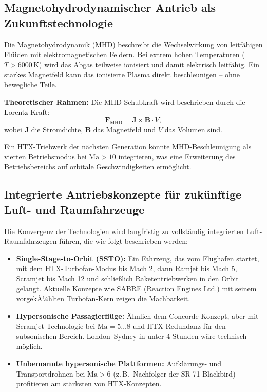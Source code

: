 ﻿\documentclass[12pt,a4paper]{article}
\theoremstyle{remark}
\newcommand{\Ma}{\mathrm{Ma}}
\begin{document}
\subsection{Magnetohydrodynamischer Antrieb als Zukunftstechnologie}

Die Magnetohydrodynamik (MHD) beschreibt die Wechselwirkung von
leitf\"ahigen Fl\"uiden mit elektromagnetischen Feldern.
Bei extrem hohen Temperaturen ($T > 6000\,\mathrm{K}$) wird
das Abgas teilweise ionisiert und damit elektrisch leitf\"ahig.
Ein starkes Magnetfeld kann das ionisierte Plasma direkt beschleunigen
-- ohne bewegliche Teile.

\textbf{Theoretischer Rahmen:}
Die MHD-Schubkraft wird beschrieben durch die Lorentz-Kraft:
\begin{equation}
  \mathbf{F}_{\mathrm{MHD}} = \mathbf{J} \times \mathbf{B} \cdot V,
  \label{eq:mhd}
\end{equation}
wobei $\mathbf{J}$ die Stromdichte, $\mathbf{B}$ das Magnetfeld und $V$ das Volumen sind.

Ein HTX-Triebwerk der n\"achsten Generation k\"onnte MHD-Beschleunigung
als vierten Betriebsmodus bei $\Ma > 10$ integrieren,
was eine Erweiterung des Betriebsbereichs auf orbitale Geschwindigkeiten erm\"oglicht.

\subsection{Integrierte Antriebskonzepte f\"ur zuk\"unftige Luft- und Raumfahrzeuge}

Die Konvergenz der Technologien wird langfristig zu vollst\"andig
integrierten Luft-Raumfahrzeugen f\"uhren, die wie folgt beschrieben werden:

\begin{itemize}
  \item \textbf{Single-Stage-to-Orbit (SSTO):}
        Ein Fahrzeug, das vom Flughafen startet, mit dem HTX-Turbofan-Modus
        bis Mach 2, dann Ramjet bis Mach 5, Scramjet bis Mach 12
        und schlie{\ss}lich Raketentriebwerken in den Orbit gelangt.
        Aktuelle Konzepte wie SABRE (Reaction Engines Ltd.)
        mit seinem vorgekÃ¼hlten Turbofan-Kern zeigen die Machbarkeit.

  \item \textbf{Hypersonische Passagierfl\"uge:}
        \"Ahnlich dem Concorde-Konzept, aber mit Scramjet-Technologie
        bei $\Ma = 5\ldots 8$ und HTX-Redundanz f\"ur den subsonischen Bereich.
        London--Sydney in unter 4 Stunden w\"are technisch m\"oglich.

  \item \textbf{Unbemannte hypersonische Plattformen:}
        Aufkl\"arungs- und Transportdrohnen bei $\Ma > 6$
        (z.\,B.\ Nachfolger der SR-71 Blackbird)
        profitieren am st\"arksten von HTX-Konzepten.
\end{itemize}
\end{document}
